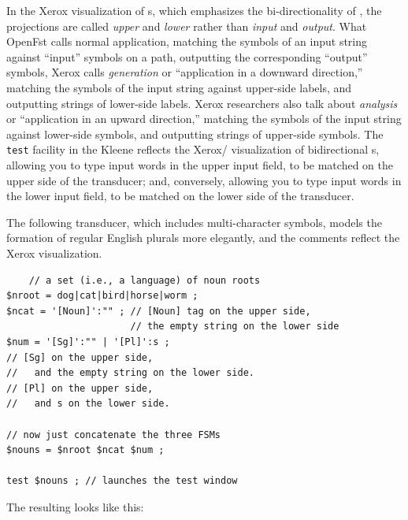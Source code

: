 In the Xerox
visualization of \fst{}s, which emphasizes the bi-directionality of , the projections
are called \emph{upper} and \emph{lower} rather than \emph{input} and \emph{output}.  
What OpenFst calls normal application, matching the symbols
of an input string against ``input'' symbols on a path, outputting the corresponding
``output'' symbols, Xerox calls \emph{generation} or ``application in a downward
direction,'' matching the symbols of the input string against upper-side labels, and
outputting strings of lower-side labels.  Xerox
researchers also talk about \emph{analysis} or ``application in an upward direction,'' matching the symbols of
the input string against lower-side symbols, and outputting strings of upper-side symbols. 
The \texttt{test} facility in the Kleene  reflects the Xerox/
visualization of bidirectional \fst{}s, allowing you to type input words
in the upper input field, to be matched on the upper side of the
transducer; and, conversely, allowing you to type input words in the
lower input field, to be matched on the lower side of the transducer.

The following transducer, which includes multi-character symbols,
models the formation of regular English plurals more elegantly, and the
comments
reflect the Xerox
visualization.

\begin{Verbatim}
	// a set (i.e., a language) of noun roots
$nroot = dog|cat|bird|horse|worm ;
$ncat = '[Noun]':"" ; // [Noun] tag on the upper side,
                      // the empty string on the lower side
$num = '[Sg]':"" | '[Pl]':s ; 
// [Sg] on the upper side, 
//   and the empty string on the lower side.
// [Pl] on the upper side, 
//   and s on the lower side.

// now just concatenate the three FSMs
$nouns = $nroot $ncat $num ;

test $nouns ; // launches the test window
\end{Verbatim}

\noindent
The resulting \fst{} looks like this:


